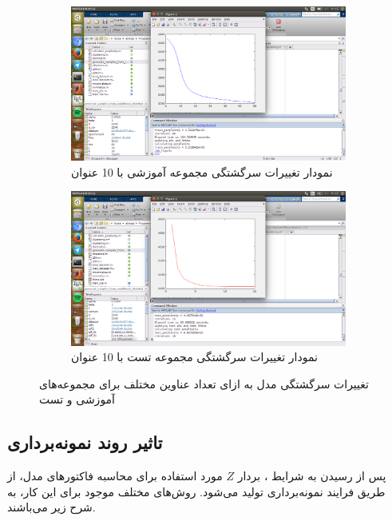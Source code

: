 \documentclass[11.5pt,a4paper]{article}
\begin{document}
\begin{figure}[h]
	\begin{subfigure}{.45\textwidth}
		\includegraphics[scale=0.2]{Imgs/k10_b1_a004_134s_ptr3218842.png}
		\caption{نمودار تغییرات سرگشتگی مجموعه‌ آموزشی با 10 عنوان}
	\end{subfigure}
	\begin{subfigure}{.45\textwidth}
		\includegraphics[scale=0.2]{Imgs/k10_b1_a003_51s_pts4407000.png}
		\caption{نمودار تغییرات سرگشتگی مجموعه‌ تست با 10 عنوان}
	\end{subfigure}
\caption{تغییرات سرگشتگی مدل به ازای تعداد عناوین مختلف برای مجموعه‌های آموزشی و تست
}
\label{fig:topics}
\end{figure} 




\subsection{تاثیر روند نمونه‌برداری}
پس از رسیدن به شرایط ، بردار $Z$ مورد استفاده برای محاسبه فاکتورهای مدل، از طریق فرایند نمونه‌برداری تولید می‌شود. روش‌های مختلف موجود برای این کار، به شرح زیر می‌باشند.
\end{document}
